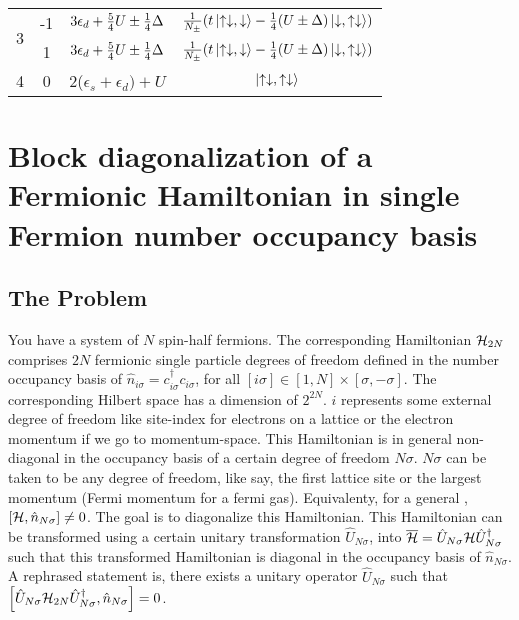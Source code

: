 \documentclass[12pt]{article}
\newcommand{\un}{\ensuremath{\hat{U}_{N\sigma}}}
\newcommand{\no}{\ensuremath{\hat{n}_{N\sigma}}}
\newcommand{\hml}{\ensuremath{\ham_{2N}}}
\begin{document}
\begin{table}
\begin{center}
\begin{tabular}{@{}cccc@{}}
                                        \toprule

\multirow{2}{*}{3} & -1 & \(3\epsilon_d + \frac{5}{4}U \pm \frac{1}{4}\Delta\)  & \(\frac{1}{N_\pm}(t\ket{\uparrow\downarrow,\downarrow}-\frac{1}{4}(U\pm\Delta)\ket{\downarrow,\uparrow\downarrow})\) \\

 \cmidrule(l){2-4}

& 1 & \(3\epsilon_d + \frac{5}{4}U \pm \frac{1}{4}\Delta\)  & \(\frac{1}{N_\pm}(t\ket{\uparrow\downarrow,\downarrow}-\frac{1}{4}(U\pm\Delta)\ket{\downarrow,\uparrow\downarrow})\) \\
 \toprule

4                                      & 0                   & 2(\(\epsilon_s+\epsilon_d)+U\)  & \(\ket{\uparrow\downarrow,\uparrow\downarrow}\) \\


\toprule
\end{tabular}
\end{center}
\end{table}

\section{Block diagonalization of a Fermionic Hamiltonian in single Fermion number occupancy basis}
\subsection{The Problem} You have a system of \(N\) spin-half fermions. The corresponding Hamiltonian \(\hml\) comprises \(2N\) fermionic single particle degrees of freedom defined in the number occupancy basis of \(\hat{n}_{i\sigma} = c^\dagger_{i\sigma}c_{i\sigma}\), for all \([i\sigma]\in[1,N]\times[\sigma,-\sigma]\). The corresponding Hilbert space has a dimension of \(2^{2N}\). \(i\) represents some external degree of freedom like site-index for electrons on a lattice or the electron momentum if we go to momentum-space. This Hamiltonian is in general non-diagonal in the occupancy basis of a certain degree of freedom \(N\sigma\). \(N\sigma\) can be taken to be any degree of freedom, like say, the first lattice site or the largest momentum (Fermi momentum for a fermi gas). Equivalenty, for a general \ham, \(\left[{\mathcal{H}, \hat{n}_{N\sigma}}\right]\neq 0\). The goal is to diagonalize this Hamiltonian. 
\btm
This Hamiltonian can be transformed using a certain unitary transformation \un, into \(\overline{\ham} = \un \ham \un^\dagger\) such that this transformed Hamiltonian is diagonal in the occupancy basis of \(\hat{n}_{N\sigma}\). A rephrased statement is, there exists a unitary operator \(\un\) such that \(\qq{\un \hml \un^\dagger, \no}=0\).
\etm
\end{document}
